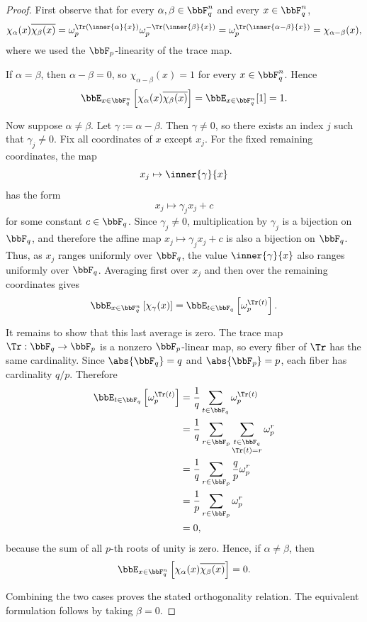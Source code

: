 \begin{proof}
First observe that for every $\alpha,\beta\in\bbF_q^n$ and every $x\in\bbF_q^n$,
\[
    \chi_\alpha(x)\overline{\chi_\beta(x)}
    =
    \omega_p^{\Tr(\inner{\alpha}{x})}
    \omega_p^{-\Tr(\inner{\beta}{x})}
    =
    \omega_p^{\Tr(\inner{\alpha-\beta}{x})}
    =
    \chi_{\alpha-\beta}(x),
\]
where we used the $\bbF_p$-linearity of the trace map.

If $\alpha=\beta$, then $\alpha-\beta=0$, so $\chi_{\alpha-\beta}(x)=1$ for every
$x\in\bbF_q^n$. Hence
\[
    \bbE_{x\in\bbF_q^n}\left[\chi_\alpha(x)\overline{\chi_\beta(x)}\right]
    =
    \bbE_{x\in\bbF_q^n}[1]
    =
    1.
\]

Now suppose $\alpha\ne\beta$. Let $\gamma:=\alpha-\beta$. Then $\gamma\ne 0$, so there exists
an index $j$ such that $\gamma_j\ne 0$. Fix all coordinates of $x$ except $x_j$. For the fixed
remaining coordinates, the map
\[
    x_j\mapsto \inner{\gamma}{x}
\]
has the form
\[
    x_j\mapsto \gamma_j x_j + c
\]
for some constant $c\in\bbF_q$. Since $\gamma_j\ne 0$, multiplication by $\gamma_j$ is a
bijection on $\bbF_q$, and therefore the affine map $x_j\mapsto \gamma_jx_j+c$ is also a
bijection on $\bbF_q$. Thus, as $x_j$ ranges uniformly over $\bbF_q$, the value
$\inner{\gamma}{x}$ also ranges uniformly over $\bbF_q$. Averaging first over $x_j$ and then
over the remaining coordinates gives
\[
    \bbE_{x\in\bbF_q^n}\left[\chi_\gamma(x)\right]
    =
    \bbE_{t\in\bbF_q}\left[\omega_p^{\Tr(t)}\right].
\]

It remains to show that this last average is zero. The trace map
$\Tr:\bbF_q\to\bbF_p$ is a nonzero $\bbF_p$-linear map, so every fiber of $\Tr$ has the same
cardinality. Since $\abs{\bbF_q}=q$ and $\abs{\bbF_p}=p$, each fiber has cardinality $q/p$.
Therefore
\begin{align*}
    \bbE_{t\in\bbF_q}\left[\omega_p^{\Tr(t)}\right]
    &=
    \frac{1}{q}\sum_{t\in\bbF_q}\omega_p^{\Tr(t)} \\
    &=
    \frac{1}{q}\sum_{r\in\bbF_p}
        \sum_{\substack{t\in\bbF_q\\ \Tr(t)=r}}
        \omega_p^r \\
    &=
    \frac{1}{q}\sum_{r\in\bbF_p}\frac{q}{p}\omega_p^r \\
    &=
    \frac{1}{p}\sum_{r\in\bbF_p}\omega_p^r \\
    &=0,
\end{align*}
because the sum of all $p$-th roots of unity is zero. Hence, if $\alpha\ne\beta$, then
\[
    \bbE_{x\in\bbF_q^n}\left[\chi_\alpha(x)\overline{\chi_\beta(x)}\right]
    =
    0.
\]

Combining the two cases proves the stated orthogonality relation. The equivalent formulation
follows by taking $\beta=0$.
\end{proof}

